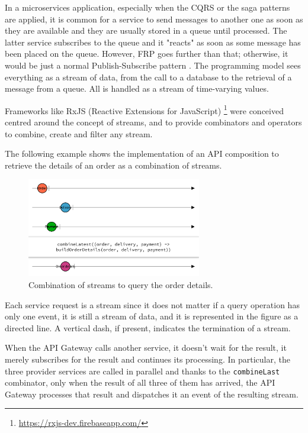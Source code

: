\documentclass[conference]{IEEEtran}
\begin{document}
In a microservices application, especially when the CQRS or the saga patterns are applied, it is common for a service to send messages to another one as soon as they are available and they are usually stored in a queue until processed. The latter service subscribes to the queue and it "reacts" as soon as some message has been placed on the queue. However, FRP goes further than that; otherwise, it would be just a normal Publish-Subscribe pattern \cite{pubsub}. The programming model sees everything as a stream of data, from the call to a database to the retrieval of a message from a queue. All is handled as a stream of time-varying values.

Frameworks like RxJS (Reactive Extensions for JavaScript) \footnote{\url{https://rxjs-dev.firebaseapp.com/}} were conceived centred around the concept of streams, and to provide combinators and operators to combine, create and filter any stream.

The following example shows the implementation of an API composition to retrieve the details of an order as a combination of streams.

\begin{figure}[!htbp]
\centering
\includegraphics[width=3in]{jpeg/rx-orders}
\caption{Combination of streams to query the order details.}
\label{rx-orders}
\end{figure}

Each service request is a stream since it does not matter if a query operation has only one event, it is still a stream of data, and it is represented in the figure as a directed line. A vertical dash, if present, indicates the termination of a stream.

When the API Gateway calls another service, it doesn't wait for the result, it merely subscribes for the result and continues its processing. In particular, the three provider services are called in parallel and thanks to the \texttt{combineLast} combinator, only when the result of all three of them has arrived, the API Gateway processes that result and dispatches it an event of the resulting stream.
\end{document}
